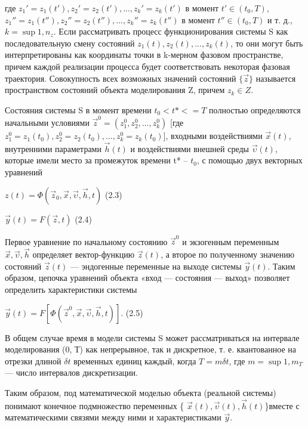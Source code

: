   где $z_{1}'= z_{1}(t'), z_{2}' = z_{2}(t'), ... , z_{k}' = z_{k}(t')$ в момент $t' \in (t_{0}, T)$, $z_{1}'' = z_{1}(t''), z_{2}'' = z_{2}(t''), ... , z_{k}'' = z_{k}(t'')$  в момент $t'' \in (t_{0}, T)$ и т. д., $k = \sup{1, n_{z}}$. Если рассматривать процесс функционирования системы S как последовательную смену состояний $z_{1}(t), z_{2}(t), ... , z_{k}(t)$, то они могут быть интерпретированы как координаты точки в k-мерном фазовом пространстве, причем каждой реализации процесса будет соответствовать некоторая фазовая траектория. Совокупность всех возможных значений состояний $\{\vec{z}\}$ называется пространством состояний объекта моделирования Z, причем $z_{k} \in Z$.

  Состояния системы S в момент времени $t_{0} < t* <= T $ полностью определяются начальными условиями $\vec{z}^{0} = (z^{0}_{1}, z^{0}_{2}, ... , z^{0}_{k})$ [где $z^{0}_{1} = z_{1}(t_{0}), z^{0}_{2} = z_{2}(t_{0}), ... , z^{0}_{k} = z_{k}(t_{0})$], входными воздействиями $\vec{x}(t)$, внутренними параметрами $\vec{h}(t)$ и воздействиями внешней среды $\vec{\upsilon}(t)$, которые имели место за промежуток времени t* -- $t_{0}$, с помощью двух векторных уравнений

  \begin{center}
     $z(t) = \Phi(\vec{z}_{0}, \vec{x}, \vec{\upsilon}, \vec{h}, t)$ (2.3)

     $\vec{y}(t) = F(\vec{z}, t)$ (2.4)
  \end{center}


  Первое уравнение по начальному состоянию $\vec{z}^{0}$ и экзогенным переменным $\vec{x}, \vec{\upsilon}, \vec{h}$ определяет вектор-функцию $\vec{z}(t)$, а второе по полученному значению состояний $\vec{z}(t)$ — эндогенные переменные на выходе системы $\vec{y}(t)$. Таким образом, цепочка уравнений объекта «вход — состояния — выход» позволяет определить характеристики системы

  \begin{center}
    $\vec{y}(t) = F[\Phi(\vec{z}^{0}, \vec{x}, \vec{\upsilon}, \vec{h}, t)]$. (2.5)
  \end{center}

  В общем случае время в модели системы S может рассматриваться на интервале моделирования (0, Т) как непрерывное, так и дискретное, т. е. квантованное на отрезки длиной $\delta t$ временных единиц каждый, когда $T = m\delta t$, где $m = \sup{1,m_{T}}$ — число интервалов дискретизации.

  Таким образом, под математической моделью объекта (реальной системы) понимают конечное подмножество переменных \{ $\vec{x}(t), \vec{\upsilon}(t), \vec{h}(t) $\}вместе с математическими связями между ними и характеристиками $\vec{y}$.

